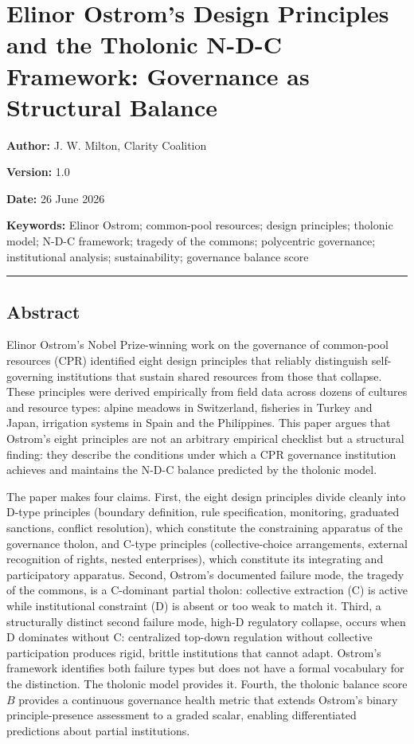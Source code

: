 \documentclass[
  11pt,
  letterpaper,
]{article}
\author{}
\date{}
\begin{document}
\section{Elinor Ostrom's Design Principles and the Tholonic N-D-C
Framework: Governance as Structural
Balance}\label{elinor-ostroms-design-principles-and-the-tholonic-n-d-c-framework-governance-as-structural-balance}

\textbf{Author:} J. W. Milton, Clarity Coalition

\textbf{Version:} 1.0

\textbf{Date:} 26 June 2026

\textbf{Keywords:} Elinor Ostrom; common-pool resources; design
principles; tholonic model; N-D-C framework; tragedy of the commons;
polycentric governance; institutional analysis; sustainability;
governance balance score

\begin{center}\rule{0.5\linewidth}{0.5pt}\end{center}

\subsection{Abstract}\label{abstract}

Elinor Ostrom's Nobel Prize-winning work on the governance of
common-pool resources (CPR) identified eight design principles that
reliably distinguish self-governing institutions that sustain shared
resources from those that collapse. These principles were derived
empirically from field data across dozens of cultures and resource
types: alpine meadows in Switzerland, fisheries in Turkey and Japan,
irrigation systems in Spain and the Philippines. This paper argues that
Ostrom's eight principles are not an arbitrary empirical checklist but a
structural finding: they describe the conditions under which a CPR
governance institution achieves and maintains the N-D-C balance
predicted by the tholonic model.

The paper makes four claims. First, the eight design principles divide
cleanly into D-type principles (boundary definition, rule specification,
monitoring, graduated sanctions, conflict resolution), which constitute
the constraining apparatus of the governance tholon, and C-type
principles (collective-choice arrangements, external recognition of
rights, nested enterprises), which constitute its integrating and
participatory apparatus. Second, Ostrom's documented failure mode, the
tragedy of the commons, is a C-dominant partial tholon: collective
extraction (C) is active while institutional constraint (D) is absent or
too weak to match it. Third, a structurally distinct second failure
mode, high-D regulatory collapse, occurs when D dominates without C:
centralized top-down regulation without collective participation
produces rigid, brittle institutions that cannot adapt. Ostrom's
framework identifies both failure types but does not have a formal
vocabulary for the distinction. The tholonic model provides it. Fourth,
the tholonic balance score \(B\) provides a continuous governance health
metric that extends Ostrom's binary principle-presence assessment to a
graded scalar, enabling differentiated predictions about partial
institutions.
\end{document}
